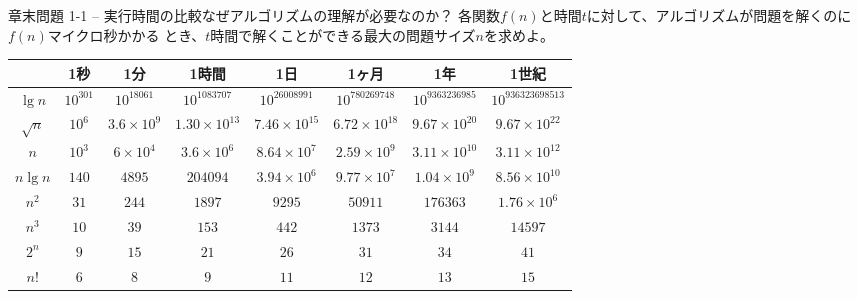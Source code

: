 \documentclass[unicode,11pt,aspectratio=169,notes]{beamer} %
\begin{document}

\begin{frame}{章末問題 1-1 -- 実行時間の比較}{なぜアルゴリズムの理解が必要なのか？}
  各関数$f(n)$と時間$t$に対して、アルゴリズムが問題を解くのに$f(n)$マイクロ秒かかる
  とき、$t$時間で解くことができる最大の問題サイズ$n$を求めよ。

  {\scriptsize \begin{center}
    \begin{tabular}{|c|c|c|c|c|c|c|c|}
      \hline
      & 1秒 & 1分 & 1時間 & 1日 & 1ヶ月 & 1年 & 1世紀 \\ \hline
      $\lg n$ & $10^{301}$ & $10^{18061}$ & $10^{1083707}$ & $10^{26008991}$ &
        $10^{78 0269748}$ & $10^{9363236985}$ & $10^{936323698513}$ \\ \hline
      $\sqrt{n}$ & $10^6$ & $3.6\times 10^9$ & $1.30 \times 10^{13}$ &
        $7.46 \times 10^{15}$ & $6.72 \times 10^{18}$ & $9.67 \times 10^{20}$ &
        $9.67 \times 10^{22}$ \\ \hline
      $n$ & $10^3$ & $6 \times 10^4$ & $3.6 \times 10^6$ & $8.64 \times 10^7$ &
        $2.59 \times 10^9$ & $3.11 \times 10^{10}$ & $3.11 \times 10^{12}$
        \\ \hline
      $n\lg n$ & $140$ & $4895$ & $204094$ & $3.94 \times 10^6$ &
        $9.77 \times 10^7$ & $1.04 \times 10^9$ & $8.56 \times 10^{10}$
        \\ \hline
      $n^2$ & $31$ & $244$ & $1897$ & $9295$ & $50911$ & $176363$ &
        $1.76 \times 10^6$ \\ \hline
      $n^3$ & $10$ & $39$ & $153$ & $442$ & $1373$ & $3144$ & $14597$ \\ \hline
      $2^n$ & $9$ & $15$ & $21$ & $26$ & $31$ & $34$ & $41$ \\ \hline
      $n!$ & $6$ & $8$ & $9$ & $11$ & $12$ & $13$ & $15$ \\
      \hline
    \end{tabular}
  \end{center}}
\end{frame}
\end{document}
